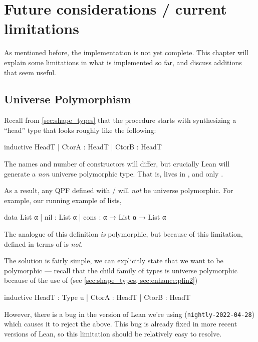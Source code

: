 
\chapter{Future considerations / current limitations}
\label{ch:limitations}


As mentioned before, the implementation is not yet complete.
This chapter will explain some limitations in what is implemented so far, and discuss
additions that seem useful.

\section{Universe Polymorphism}

Recall from \ref{sec:shape_types} that the procedure starts with synthesizing a ``head'' type that
looks roughly like the following:
\begin{leancode}
  inductive HeadT
    | CtorA : HeadT
    | CtorB : HeadT
\end{leancode}
The names and number of constructors will differ, but crucially Lean will generate a \emph{non} universe 
polymorphic type. That is,  lives in , and only .

As a result, any QPF defined with \data{}/\codata{} will \emph{not} be universe polymorphic.
For example, our running example of lists,
\begin{leancode}
  data List α 
    | nil  : List α
    | cons : α → List α → List α
\end{leancode}

The \inductive{} analogue of this definition \emph{is} polymorphic, but because of this limitation,
 defined in terms of \data{} is \emph{not}.
  

The solution is fairly simple, we can explicitly state that we want  to be polymorphic
--- recall that the child family of types is universe polymorphic because of the use of  (see \ref{sec:shape_types, sec:enhance:pfin2})
\begin{badleancode}

  inductive HeadT : Type u
    | CtorA : HeadT
    | CtorB : HeadT

\end{badleancode}

However, there is a bug in the version of Lean we're using (\texttt{nightly-2022-04-28}) 
which causes it to reject the above. 
This bug is already fixed in more recent versions of Lean, 
so this limitation should be relatively easy to resolve.



